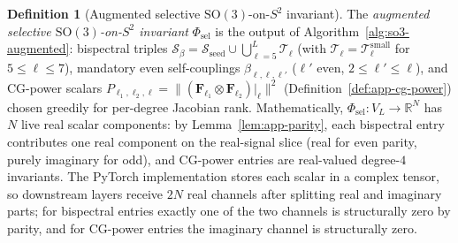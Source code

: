 \documentclass{article}
\theoremstyle{definition}
\newtheorem{definition}[theorem]{Definition}
\theoremstyle{remark}
\newcommand{\R}{\mathbb{R}}
\newcommand{\SO}{\mathrm{SO}}
\theoremstyle{definition}
\begin{document}
\begin{definition}[Augmented selective $\SO(3)$-on-$S^2$ invariant]
The \emph{augmented selective $\SO(3)$-on-$S^2$ invariant}
$\Phi_{\mathrm{sel}}$ is the output of
Algorithm~\ref{alg:so3-augmented}: bispectral triples
$\mathcal{S}_\beta = \mathcal{S}_{\mathrm{seed}}\cup
\bigcup_{\ell=5}^{L}\mathcal{T}_\ell$ (with
$\mathcal{T}_\ell = \mathcal{T}_\ell^{\mathrm{small}}$ for
$5\le\ell\le 7$), mandatory even self-couplings
$\beta_{\ell,\ell,\ell'}$ ($\ell'$ even, $2\le\ell'\le\ell$), and
CG-power scalars $P_{\ell_1,\ell_2,\ell} = \lVert(\mathbf{F}_{\ell_1}
\otimes \mathbf{F}_{\ell_2})|_\ell\rVert^2$
(Definition~\ref{def:app-cg-power}) chosen greedily for per-degree
Jacobian rank. Mathematically, $\Phi_{\mathrm{sel}}:V_L\to\R^N$ has
$N$ live real scalar components: by
Lemma~\ref{lem:app-parity}, each bispectral entry contributes one
real component on the real-signal slice (real for even parity,
purely imaginary for odd), and CG-power entries are real-valued
degree-$4$ invariants. The PyTorch implementation stores each
scalar in a complex tensor, so downstream layers receive $2N$ real
channels after splitting real and imaginary parts; for bispectral
entries exactly one of the two channels is structurally zero by
parity, and for CG-power entries the imaginary channel is
structurally zero.
\end{definition}
\end{document}
